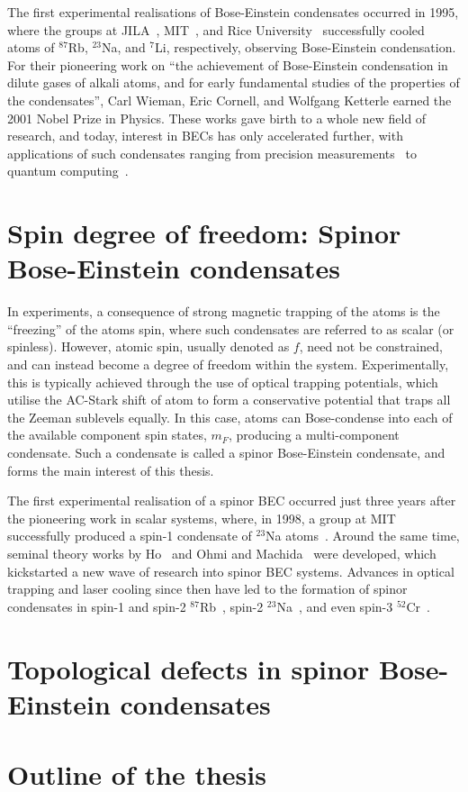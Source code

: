 The first experimental realisations of Bose-Einstein condensates occurred in
1995, where the groups at JILA~\cite{Anderson1995}, MIT~\cite{Davis1995}, and
Rice University~\cite{Bradley1995} successfully cooled atoms of \(^{87}\)Rb,
\(^{23}\)Na, and \(^{7}\)Li, respectively, observing Bose-Einstein condensation.
For their pioneering work on ``the achievement of Bose-Einstein condensation in
dilute gases of alkali atoms, and for early fundamental studies of the
properties of the condensates'', Carl Wieman, Eric Cornell, and Wolfgang
Ketterle earned the 2001 Nobel Prize in Physics.
These works gave birth to a whole new field of research, and today, interest in
BECs has only accelerated further, with applications of such condensates ranging
from precision measurements~\cite{Obrecht2007} to quantum
computing~\cite{Byrnes2012}.

\section{Spin degree of freedom: Spinor Bose-Einstein condensates}
In experiments, a consequence of strong magnetic trapping of the atoms is the
``freezing'' of the atoms spin, where such condensates are referred to as
scalar (or spinless).
However, atomic spin, usually denoted as \(f\), need not be constrained, and
can instead become a degree of freedom within the system.
Experimentally, this is typically achieved through the use of optical trapping
potentials, which utilise the AC-Stark shift of atom to form a conservative
potential that traps all the Zeeman sublevels equally.
In this case, atoms can Bose-condense into each of the available component spin
states, \(m_F\), producing a multi-component condensate.
Such a condensate is called a spinor Bose-Einstein condensate, and forms the
main interest of this thesis.

The first experimental realisation of a spinor BEC occurred just three years
after the pioneering work in scalar systems, where, in 1998, a group at MIT
successfully produced a spin-1 condensate of \({^{23}}\)Na
atoms~\cite{StamperKurn1998}.
Around the same time, seminal theory works by Ho~\cite{Ho1998} and Ohmi and
Machida~\cite{Ohmi1998} were developed, which kickstarted a new wave of research
into spinor BEC systems.
Advances in optical trapping and laser cooling since then have led to the
formation of spinor condensates in spin-1 and spin-2
\(^{87}\)Rb~\cite{Barrett2001, Schmaljohann2004},
spin-2 \(^{23}\)Na~\cite{Gorlitz2003}, and
even spin-3 \(^{52}\)Cr~\cite{Beaufils2008}.


\section{Topological defects in spinor Bose-Einstein condensates}

\section{Outline of the thesis}
